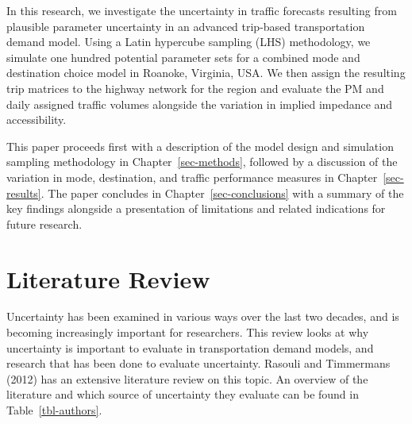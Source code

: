 \documentclass[
  futuretransp,
  submit,
  moreauthors,
]{Definitions/mdpi}
\begin{document}
In this research, we investigate the uncertainty in traffic forecasts
resulting from plausible parameter uncertainty in an advanced trip-based
transportation demand model. Using a Latin hypercube sampling (LHS)
methodology, we simulate one hundred potential parameter sets for a
combined mode and destination choice model in Roanoke, Virginia, USA. We
then assign the resulting trip matrices to the highway network for the
region and evaluate the PM and daily assigned traffic volumes alongside
the variation in implied impedance and accessibility.

This paper proceeds first with a description of the model design and
simulation sampling methodology in Chapter~\ref{sec-methods}, followed
by a discussion of the variation in mode, destination, and traffic
performance measures in Chapter~\ref{sec-results}. The paper concludes
in Chapter~\ref{sec-conclusions} with a summary of the key findings
alongside a presentation of limitations and related indications for
future research.


\section{Literature Review}\label{literature-review}

Uncertainty has been examined in various ways over the last two decades,
and is becoming increasingly important for researchers. This review
looks at why uncertainty is important to evaluate in transportation
demand models, and research that has been done to evaluate uncertainty.
Rasouli and Timmermans (2012) has an extensive literature review on this
topic. An overview of the literature and which source of uncertainty
they evaluate can be found in Table~\ref{tbl-authors}.
\end{document}
